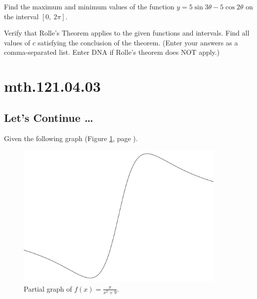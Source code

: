 \documentclass[12pt,addpoints, answers, fleqn]{exam}
\begin{document}
\begin{teacher}
\begin{questions}
Find the maximum and minimum values of the function $y = 5 \sin 3\theta - 5 \cos 2 \theta$ on the interval $\left[0, \ 2 \pi \right]$.
\begin{solution}
\end{solution}
\question 	%
Verify that Rolle's Theorem applies to the given functions and intervals. Find all values of $c$ satisfying the conclusion of the theorem. (Enter your answers as a comma-separated list. Enter DNA if Rolle's theorem does NOT apply.)
\end{questions}
\end{teacher}
\vfill
\pagebreak


\section{mth.121.04.03}
\subsection{Let's Continue \ldots}

Given the following graph (Figure \ref{fig:graph2115}, page \pageref{fig:graph2115}).

\begin{figure}[htbp] %
   \centering
   \includegraphics[width=4in]{./graphics/graph2115.pdf} 
   \caption{Partial graph of $\displaystyle f \left( x \right) = \frac{x}{x^2+9}$.}
   \label{fig:graph2115}
\end{figure}
\end{document}
